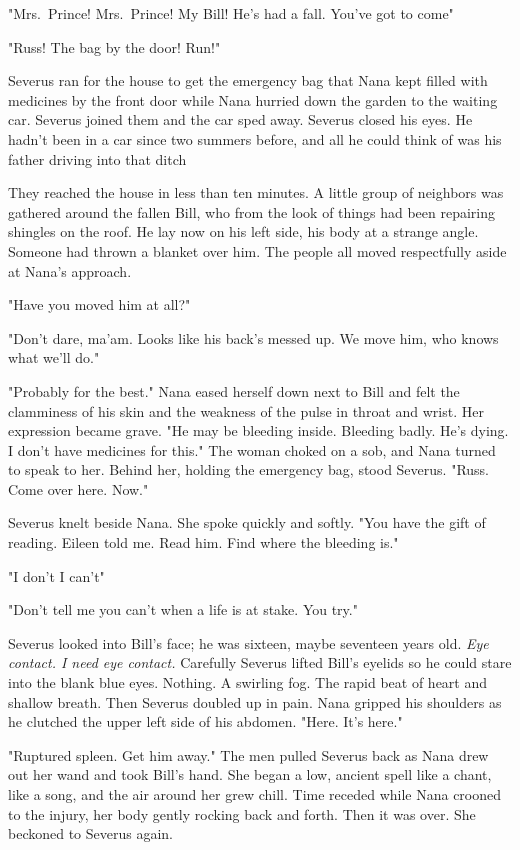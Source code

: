 "Mrs.~Prince! Mrs.~Prince! My Bill! He's had a fall. You've got to come{\el}"

"Russ! The bag by the door! Run!"

Severus ran for the house to get the emergency bag that Nana kept filled with medicines by the front door while Nana hurried down the garden to the waiting car. Severus joined them and the car sped away. Severus closed his eyes. He hadn't been in a car since two summers before, and all he could think of was his father driving into that ditch{\el}

They reached the house in less than ten minutes. A little group of neighbors was gathered around the fallen Bill, who from the look of things had been repairing shingles on the roof. He lay now on his left side, his body at a strange angle. Someone had thrown a blanket over him. The people all moved respectfully aside at Nana's approach.

"Have you moved him at all?"

"Don't dare, ma'am. Looks like his back's messed up. We move him, who knows what we'll do."

"Probably for the best." Nana eased herself down next to Bill and felt the clamminess of his skin and the weakness of the pulse in throat and wrist. Her expression became grave. "He may be bleeding inside. Bleeding badly. He's dying. I don't have medicines for this." The woman choked on a sob, and Nana turned to speak to her. Behind her, holding the emergency bag, stood Severus. "Russ. Come over here. Now."

Severus knelt beside Nana. She spoke quickly and softly. "You have the gift of reading. Eileen told me. Read him. Find where the bleeding is."

"I don't{\el} I can't{\el}"

"Don't tell me you can't when a life is at stake. You try."

Severus looked into Bill's face; he was sixteen, maybe seventeen years old. \emph{Eye contact. I need eye contact.} Carefully Severus lifted Bill's eyelids so he could stare into the blank blue eyes. Nothing. A swirling fog. The rapid beat of heart and shallow breath. Then{\el} Severus doubled up in pain. Nana gripped his shoulders as he clutched the upper left side of his abdomen. "Here. It's here."

"Ruptured spleen. Get him away." The men pulled Severus back as Nana drew out her wand and took Bill's hand. She began a low, ancient spell like a chant, like a song, and the air around her grew chill. Time receded while Nana crooned to the injury, her body gently rocking back and forth. Then it was over. She beckoned to Severus again.

